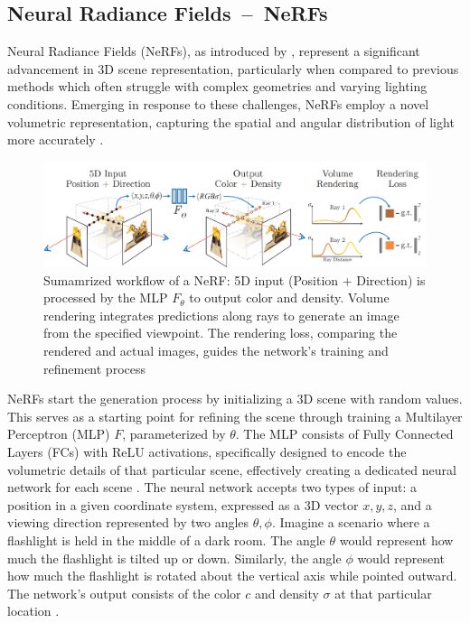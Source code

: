 \subsection{Neural Radiance Fields~--~NeRFs}\label{NeRF}

Neural Radiance Fields (NeRFs), as introduced by \citeauthor{mildenhallNERF}, represent a significant advancement in 3D scene representation, particularly when compared to previous methods which often struggle with complex geometries and varying lighting conditions. Emerging in response to these challenges, NeRFs employ a novel volumetric representation, capturing the spatial and angular distribution of light more accurately \citep{mildenhallNERF}.

\begin{figure}[ht]
    \centering
      \includegraphics[width=1\columnwidth]{figures/NeRF_Fig_2_Mildenhall.png}
      \caption{Sumamrized workflow of a NeRF\@: 5D input (Position + Direction) is processed by the MLP \(F_\theta\) to output color and density. Volume rendering integrates predictions along rays to generate an image from the specified viewpoint. The rendering loss, comparing the rendered and actual images, guides the network's training and refinement process~\cite{mildenhallNERF}}\label{fig:figureNeRF}
\end{figure}

NeRFs start the generation process by initializing a 3D scene with random values. This serves as a starting point for refining the scene through training a Multilayer Perceptron (MLP) \(F\), parameterized by \(\theta\). The MLP consists of Fully Connected Layers (FCs) with ReLU activations, specifically designed to encode the volumetric details of that particular scene, effectively creating a dedicated neural network for each scene \citep{mildenhallNERF}. The neural network accepts two types of input: a position in a given coordinate system, expressed as a 3D vector \(x, y, z\), and a viewing direction represented by two angles \( \theta, \phi \). Imagine a scenario where a flashlight is held in the middle of a dark room. The angle \( \theta \) would represent how much the flashlight is tilted up or down. Similarly, the angle \( \phi \) would represent how much the flashlight is rotated about the vertical axis while pointed outward. The network's output consists of the color \(c\) and density \( \sigma \) at that particular location \citep{mildenhallNERF}. 

